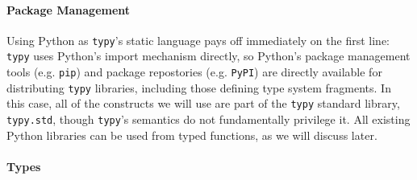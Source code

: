 \documentclass{sigplanconf}
\newcommand{\lip}[1]{\lstinline[language=Python,basicstyle=\ttfamily\small,deletendkeywords={tuple,buffer,map}]{#1}}
\begin{document}
\paragraph{Package Management} Using Python as \verb|typy|'s static language pays off immediately on the first line: \texttt{typy} uses Python's import mechanism directly, so Python's package management tools (e.g. \lip{pip}) and package repostories (e.g. \lip{PyPI}) are directly available for distributing \texttt{typy} libraries, including those defining type system fragments. In this case, all of the constructs we will use are part of the \verb|typy| standard library, \texttt{typy.std}, though \texttt{typy}'s semantics do not fundamentally privilege it. All existing Python libraries can be used from typed functions, as we will discuss later.%



\paragraph{Types}
\end{document}
